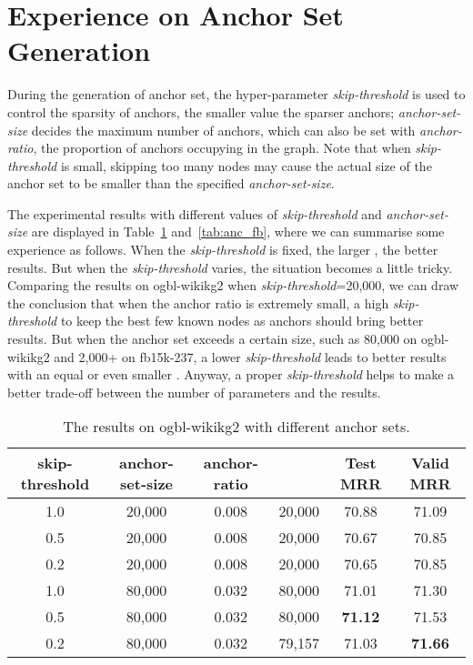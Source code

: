 \documentclass{article}
\begin{document}
 
 

\clearpage
\appendix

\section{Experience on Anchor Set Generation}
\label{apd:anchors}
During the generation of anchor set, the hyper-parameter \emph{skip-threshold} is used to control the sparsity of anchors, the smaller value the sparser anchors; \emph{anchor-set-size} decides the maximum number of anchors, which can also be set with \emph{anchor-ratio}, the proportion of anchors occupying in the graph. Note that when \emph{skip-threshold} is small, skipping too many nodes may cause the actual size of the anchor set  to be smaller than the specified \emph{anchor-set-size}.

The experimental results with different values of \emph{skip-threshold} and \emph{anchor-set-size} are displayed in Table~\ref{tab:anc_wiki} and~\ref{tab:anc_fb}, where we can summarise some experience as follows. When the \emph{skip-threshold} is fixed, the larger , the better results. But when the \emph{skip-threshold} varies, the situation becomes a little tricky.
Comparing the results on ogbl-wikikg2 when \emph{skip-threshold}=20,000, we can draw the conclusion that when the anchor ratio is extremely small, a high \emph{skip-threshold} to keep the best few known nodes as anchors should bring better results. But when the anchor set exceeds a certain size, such as 80,000 on ogbl-wikikg2 and 2,000+ on fb15k-237, a lower \emph{skip-threshold} leads to better results with an equal or even smaller .
Anyway, a proper \emph{skip-threshold} helps to make a better trade-off between the number of parameters and the results.
\begin{table}
\caption{The results on ogbl-wikikg2 with different anchor sets.}
\centering
\begin{tabular}{cccc|cc}
\toprule
skip-threshold & anchor-set-size & anchor-ratio &  & Test MRR & Valid MRR\\
\midrule
1.0 & 20,000 & 0.008 & 20,000 & 70.88 & 71.09\\
0.5 & 20,000 & 0.008  & 20,000 & 70.67 & 70.85\\
0.2 & 20,000 & 0.008  & 20,000 & 70.65 & 70.85\\
\midrule
1.0 & 80,000 & 0.032  & 80,000 & 71.01 & 71.30\\
0.5 & 80,000 & 0.032 & 80,000 & \textbf{71.12} & 71.53\\
0.2 & 80,000 & 0.032 & 79,157 & 71.03 & \textbf{71.66}\\
\bottomrule
\end{tabular}
\label{tab:anc_wiki}
\end{table}
\end{document}
